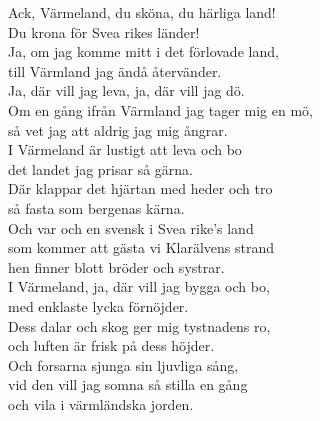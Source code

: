 \documentclass[a6paper,10pt]{article}
\begin{document}
\setlength{\oddsidemargin}{-0.47in}
\noindent
\begin{center}
\end{center}
\begin{lyrics}
Ack, Värmeland, du sköna, du härliga land!  \\
Du krona för Svea rikes länder!  \\
Ja, om jag komme mitt i det förlovade land,  \\
till Värmland jag ändå återvänder.  \\
Ja, där vill jag leva, ja, där vill jag dö.  \\
Om en gång ifrån Värmland jag tager mig en mö,  \\
så vet jag att aldrig jag mig ångrar. 
\vspace{5pt}\\
I Värmeland är lustigt att leva och bo\\
det landet jag prisar så gärna.\\
Där klappar det hjärtan med heder och tro\\
så fasta som bergenas kärna.\\
Och var och en svensk i Svea rike's land\\
som kommer att gästa vi Klarälvens strand\\
hen finner blott bröder och systrar.
\vspace{5pt}\\
I Värmeland, ja, där vill jag bygga och bo,\\
med enklaste lycka förnöjder.\\
Dess dalar och skog ger mig tystnadens ro,\\
och luften är frisk på dess höjder.\\
Och forsarna sjunga sin ljuvliga sång,\\
vid den vill jag somna så stilla en gång\\
och vila i värmländska jorden.
\end{lyrics}
\end{document}
